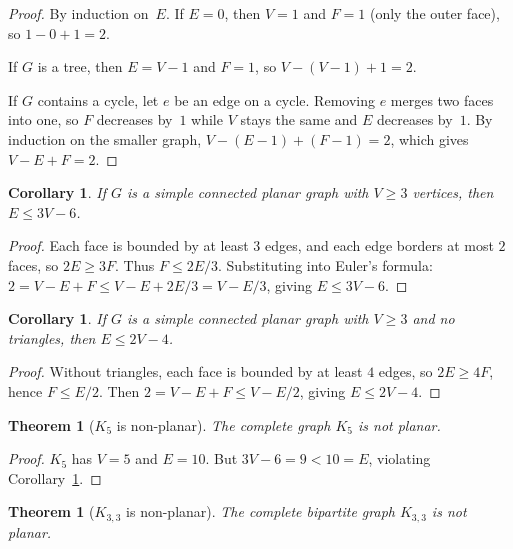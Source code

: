 \documentclass[12pt,a4paper,openany]{book}
\theoremstyle{definition}
\theoremstyle{plain}
\newtheorem{theorem}[definition]{Theorem}
\newtheorem{corollary}[definition]{Corollary}
\theoremstyle{remark}
\begin{document}
\begin{proof}
By induction on~$E$.  If $E=0$, then $V=1$ and $F=1$ (only the outer
face), so $1-0+1=2$.

If $G$ is a tree, then $E=V-1$ and $F=1$, so $V-(V-1)+1=2$.

If $G$ contains a cycle, let $e$ be an edge on a cycle.  Removing $e$
merges two faces into one, so $F$ decreases by~$1$ while $V$ stays the
same and $E$ decreases by~$1$.  By induction on the smaller graph,
$V-(E-1)+(F-1)=2$, which gives $V-E+F=2$.
\end{proof}

\begin{corollary}
\label{cor:edge-bound}
If $G$ is a simple connected planar graph with $V\ge 3$ vertices, then
$E\le 3V-6$.
\end{corollary}

\begin{proof}
Each face is bounded by at least $3$ edges, and each edge borders at
most $2$ faces, so $2E\ge 3F$.  Thus $F\le 2E/3$.  Substituting into
Euler's formula: $2=V-E+F\le V-E+2E/3=V-E/3$, giving $E\le 3V-6$.
\end{proof}

\begin{corollary}
\label{cor:edge-bound-triangle-free}
If $G$ is a simple connected planar graph with $V\ge 3$ and no
triangles, then $E\le 2V-4$.
\end{corollary}

\begin{proof}
Without triangles, each face is bounded by at least $4$ edges, so
$2E\ge 4F$, hence $F\le E/2$.  Then $2=V-E+F\le V-E/2$, giving
$E\le 2V-4$.
\end{proof}

\begin{theorem}[$K_5$ is non-planar]
\label{thm:K5-nonplanar}
The complete graph $K_5$ is not planar.
\end{theorem}

\begin{proof}
$K_5$ has $V=5$ and $E=10$.  But $3V-6=9<10=E$, violating
Corollary~\ref{cor:edge-bound}.
\end{proof}

\begin{theorem}[$K_{3,3}$ is non-planar]
\label{thm:K33-nonplanar}
The complete bipartite graph $K_{3,3}$ is not planar.
\end{theorem}
\end{document}
